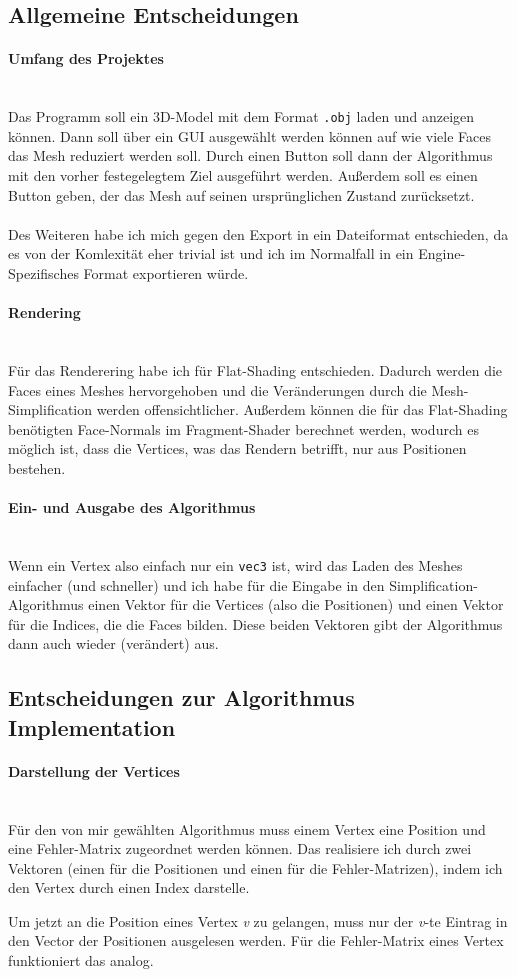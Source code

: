 \documentclass[a4paper,12pt]{article}
\newcommand{\myparagraph}[1]{\paragraph*{#1}\mbox{}\\}
\begin{document}
\subsection*{Allgemeine Entscheidungen}

\myparagraph{Umfang des Projektes}
Das Programm soll ein 3D-Model mit dem Format \texttt{.obj} laden und anzeigen können. Dann soll über ein GUI ausgewählt werden können auf wie viele Faces das Mesh reduziert werden soll. Durch einen Button soll dann der Algorithmus mit den vorher festegelegtem Ziel ausgeführt werden. Außerdem soll es einen Button geben, der das Mesh auf seinen ursprünglichen Zustand zurücksetzt.
\\
\\
Des Weiteren habe ich mich gegen den Export in ein Dateiformat entschieden, da es von der Komlexität eher trivial ist und ich im Normalfall in ein Engine-Spezifisches Format exportieren würde.

\myparagraph{Rendering}
Für das Renderering habe ich für Flat-Shading entschieden. Dadurch werden die Faces eines Meshes hervorgehoben und die Veränderungen durch die Mesh-Simplification werden offensichtlicher.
Außerdem können die für das Flat-Shading benötigten Face-Normals im Fragment-Shader berechnet werden, wodurch es möglich ist, dass die Vertices, was das Rendern betrifft, nur aus Positionen bestehen. 

\myparagraph{Ein- und Ausgabe des Algorithmus}
Wenn ein Vertex also einfach nur ein \texttt{vec3} ist, wird das Laden des Meshes einfacher (und schneller) und ich habe für die Eingabe in den Simplification-Algorithmus einen Vektor für die Vertices (also die Positionen) und einen Vektor für die Indices, die die Faces bilden. Diese beiden Vektoren gibt der Algorithmus dann auch wieder (verändert) aus.

\subsection*{Entscheidungen zur Algorithmus Implementation}

\myparagraph{Darstellung der Vertices}
Für den von mir gewählten Algorithmus muss einem Vertex eine Position und eine Fehler-Matrix zugeordnet werden können.
Das realisiere ich durch zwei Vektoren (einen für die Positionen und einen für die Fehler-Matrizen), indem ich den Vertex durch einen Index darstelle.

Um jetzt an die Position eines Vertex \emph{v} zu gelangen, muss nur der \emph{v}-te Eintrag in den Vector der Positionen ausgelesen werden. Für die Fehler-Matrix eines Vertex funktioniert das analog.
\end{document}

